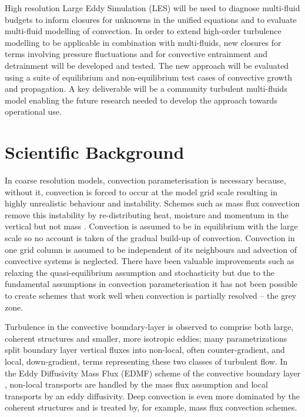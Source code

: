 \documentclass[11pt,a4paper]{article}
\begin{document}
High resolution Large Eddy Simulation (LES) will be used to diagnose multi-fluid budgets to inform closures for unknowns in the unified equations and to evaluate multi-fluid modelling of convection. In order to extend high-order turbulence modelling to be applicable in combination with multi-fluids, new closures for terms involving pressure fluctuations and for convective entrainment and detrainment will be developed and tested. The new approach will be evaluated using a suite of equilibrium and non-equilibrium test cases of convective growth and propagation. A key deliverable will be a community turbulent multi-fluids model enabling the future research needed to develop the approach towards operational use.


\section{Scientific Background}

In coarse resolution models, convection parameterisation is necessary because, without it, convection is forced to occur at the model grid scale resulting in highly unrealistic behaviour and instability. Schemes such as mass flux convection remove this instability by re-distributing heat, moisture and momentum in the vertical but not mass \cite[]{Tied89,GR90}. Convection is assumed to be in equilibrium with the large scale so no account is taken of the gradual build-up of convection. Convection in one grid column is assumed to be independent of its neighbours and advection of convective systems is neglected. There have been valuable improvements such as relaxing the quasi-equilibrium assumption \cite[]{PR98,GG05,Par14} and stochasticity \cite[]{PC08} but due to the fundamental assumptions in convection parameterisation it has not been possible to create schemes that work well when convection is partially resolved -- the grey zone.

Turbulence in the convective boundary-layer is observed to comprise both large, coherent structures and smaller, more isotropic eddies; many parametrizations \cite[e.g.][]{LBB+00} split boundary layer vertical fluxes into non-local, often counter-gradient, and local, down-gradient, terms representing these two classes of turbulent flow. In the Eddy Diffusivity Mass Flux (EDMF) scheme of the convective boundary layer \cite[]{SST07}, non-local transports are handled by the mass flux assumption and local transports by an eddy diffusivity. Deep convection is even more dominated by the coherent structures and is treated by, for example, mass flux convection schemes. 
\end{document}
